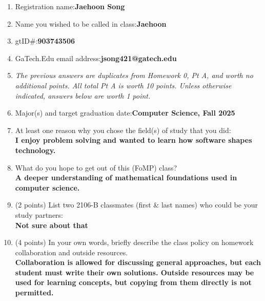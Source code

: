 \begin{enumerate}[label=\textbf{\arabic*.}]
  \item Registration name:\HF \textbf{Jaehoon Song} \\ 
  
  \item Name you wished to be called in class:\HF \textbf{Jaehoon} \\ 
  
  \item gtID\#:\HF \textbf{903743506} \\ 
  
  \item GaTech.Edu email address:\HF \textbf{jsong421@gatech.edu} \\ 
  
    \item \textit{The previous answers are duplicates from Homework 0, Pt A, and 
    worth no additional points. 
    All total Pt A is worth 10 points.
    Unless otherwise indicated, answers below are worth 1 point.} \\
    
    \item Major(s) and target graduation date:\HF \textbf{Computer Science, Fall 2025}\\
    
    \item At least one reason why you chose the field(s) of study that you did:\\
    \textbf{I enjoy problem solving and wanted to learn how software shapes technology.}\\
    
    \item What do you hope to get out of this (FoMP) class?\\
    \textbf{A deeper understanding of mathematical foundations used in computer science.}\\
    
    
    \item (2 points) List two 2106-B classmates (first \& last names) 
    who could be your study partners:\\
    \textbf{Not sure about that}\\
    
    
    \item (4 points) In your own words, briefly describe the class 
    policy on homework collaboration and outside resources. \\
    \textbf{Collaboration is allowed for discussing general approaches, 
    but each student must write their own solutions. Outside resources 
    may be used for learning concepts, but copying from them directly 
    is not permitted.}\\
    

\end{enumerate}
